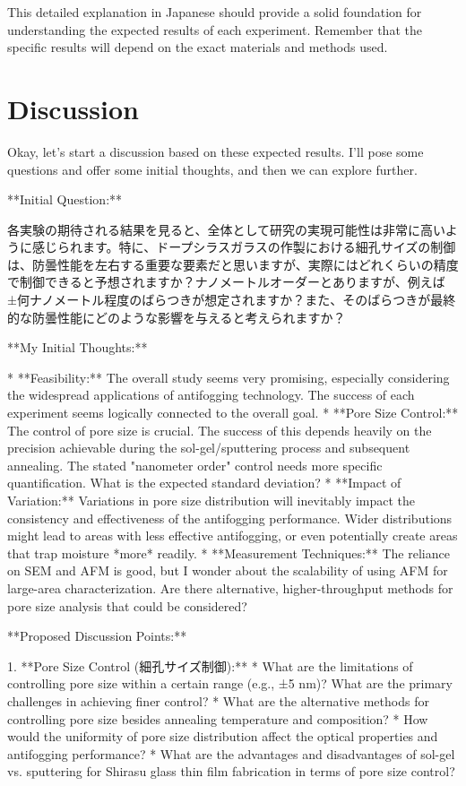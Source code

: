\documentclass{article}
\begin{document}
This detailed explanation in Japanese should provide a solid foundation for understanding the expected results of each experiment.  Remember that the specific results will depend on the exact materials and methods used.


\section{Discussion}
Okay, let's start a discussion based on these expected results.  I'll pose some questions and offer some initial thoughts, and then we can explore further.

**Initial Question:**

各実験の期待される結果を見ると、全体として研究の実現可能性は非常に高いように感じられます。特に、ドープシラスガラスの作製における細孔サイズの制御は、防曇性能を左右する重要な要素だと思いますが、実際にはどれくらいの精度で制御できると予想されますか？ナノメートルオーダーとありますが、例えば±何ナノメートル程度のばらつきが想定されますか？また、そのばらつきが最終的な防曇性能にどのような影響を与えると考えられますか？

**My Initial Thoughts:**

*   **Feasibility:** The overall study seems very promising, especially considering the widespread applications of antifogging technology. The success of each experiment seems logically connected to the overall goal.
*   **Pore Size Control:** The control of pore size is crucial.  The success of this depends heavily on the precision achievable during the sol-gel/sputtering process and subsequent annealing.  The stated "nanometer order" control needs more specific quantification.  What is the expected standard deviation?
*   **Impact of Variation:** Variations in pore size distribution will inevitably impact the consistency and effectiveness of the antifogging performance. Wider distributions might lead to areas with less effective antifogging, or even potentially create areas that trap moisture *more* readily.
*   **Measurement Techniques:**  The reliance on SEM and AFM is good, but I wonder about the scalability of using AFM for large-area characterization.  Are there alternative, higher-throughput methods for pore size analysis that could be considered?

**Proposed Discussion Points:**

1.  **Pore Size Control (細孔サイズ制御):**
    *   What are the limitations of controlling pore size within a certain range (e.g., ±5 nm)? What are the primary challenges in achieving finer control?
    *   What are the alternative methods for controlling pore size besides annealing temperature and composition?
    *   How would the uniformity of pore size distribution affect the optical properties and antifogging performance?
    *   What are the advantages and disadvantages of sol-gel vs. sputtering for Shirasu glass thin film fabrication in terms of pore size control?
\end{document}
